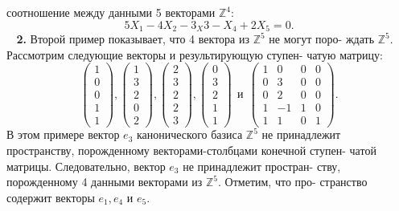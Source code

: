 	соотношение между данными 5 векторами $\mathbb Z^4$:
	$$5X_1 - 4X_2 - 3_X3 - X_4 + 2X_5 = 0.$$
	${\ \ \ \ }${\bf 2.} Второй пример показывает, что 4 вектора из $\mathbb Z^5$ не могут поро-\linebreak
	ждать $\mathbb Z^5$. Рассмотрим следующие векторы и результирующую ступен-\linebreak
	чатую матрицу:
	$$\begin{pmatrix} 1 \\ 0 \\ 0 \\ 1 \\ 1 \end{pmatrix}, \begin{pmatrix} 1 \\ 3 \\ 2 \\ 0 \\ 2 \end{pmatrix}, \begin{pmatrix} 2 \\ 3 \\ 2 \\ 2 \\ 3 \end{pmatrix}, \begin{pmatrix} 0 \\ 3 \\ 2 \\ 1 \\ 1 \end{pmatrix} \ \ \text{и}\ \ \begin{pmatrix} 1 & 0 & 0 & 0 \\ 0 & 3 & 0 & 0 \\ 0 & 2 & 0 & 0 \\ 1 & -1 & 1 & 0 \\ 1 & 1 & 0 & 1 \end{pmatrix}.$$
	В этом примере вектор $e_3$ канонического базиса $\mathbb Z^5$ не принадлежит\linebreak
	пространству, порожденному векторами-столбцами конечной ступен-\linebreak
	чатой матрицы. Следовательно, вектор $e_3$ не принадлежит простран-\linebreak
	ству, порожденному 4 данными векторами из $\mathbb Z^5$. Отметим, что про-\linebreak
	странство содержит векторы $e_1, e_4$ и $e_5$.
	
	\pagebreak
	
	
